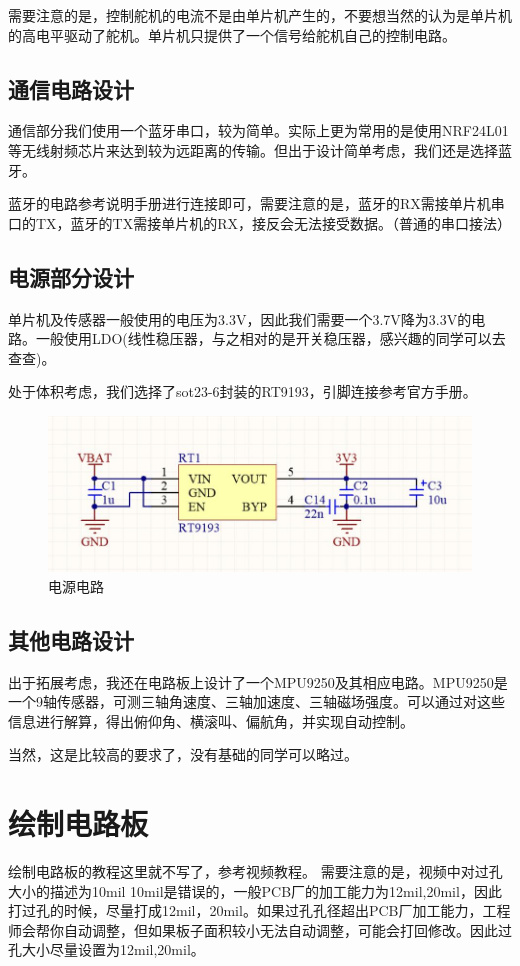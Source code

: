 \documentclass{article}
\begin{document}
需要注意的是，控制舵机的电流不是由单片机产生的，不要想当然的认为是单片机的高电平驱动了舵机。单片机只提供了一个信号给舵机自己的控制电路。

\subsection{通信电路设计}
通信部分我们使用一个蓝牙串口，较为简单。实际上更为常用的是使用NRF24L01等无线射频芯片来达到较为远距离的传输。但出于设计简单考虑，我们还是选择蓝牙。

蓝牙的电路参考说明手册进行连接即可，需要注意的是，蓝牙的RX需接单片机串口的TX，蓝牙的TX需接单片机的RX，接反会无法接受数据。（普通的串口接法）

\subsection{电源部分设计}
单片机及传感器一般使用的电压为3.3V，因此我们需要一个3.7V降为3.3V的电路。一般使用LDO(线性稳压器，与之相对的是开关稳压器，感兴趣的同学可以去查查)。

处于体积考虑，我们选择了sot23-6封装的RT9193，引脚连接参考官方手册。

\begin{figure}[ht]
	\centering
	\includegraphics[scale=0.4]{rt9193.jpg}
	\caption{电源电路}
	\label{fig:label}
\end{figure}

\subsection{其他电路设计}
出于拓展考虑，我还在电路板上设计了一个MPU9250及其相应电路。MPU9250是一个9轴传感器，可测三轴角速度、三轴加速度、三轴磁场强度。可以通过对这些信息进行解算，得出俯仰角、横滚叫、偏航角，并实现自动控制。

当然，这是比较高的要求了，没有基础的同学可以略过。

\section{绘制电路板}
绘制电路板的教程这里就不写了，参考视频教程。
需要注意的是，视频中对过孔大小的描述为10mil 10mil是错误的，一般PCB厂的加工能力为12mil,20mil，因此打过孔的时候，尽量打成12mil，20mil。如果过孔孔径超出PCB厂加工能力，工程师会帮你自动调整，但如果板子面积较小无法自动调整，可能会打回修改。因此过孔大小尽量设置为12mil,20mil。
\end{document}
